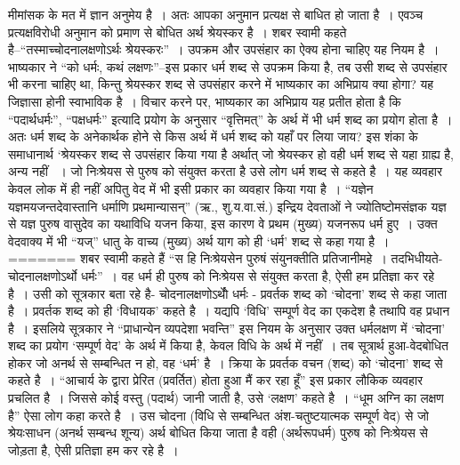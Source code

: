 मीमांसक के मत में ज्ञान अनुमेय है~। अतः आपका अनुमान प्रत्यक्ष से बाधित हो जाता है~। एवञ्च प्रत्यक्षविरोधी अनुमान को प्रमाण से बोधित अर्थ श्रेयस्कर है~। शबर स्वामी कहते है–“तस्माच्चोदनालक्षणोऽर्थः श्रेयस्करः”~। उपक्रम और उपसंहार का ऐक्य होना चाहिए यह नियम है~। भाष्यकार ने “को धर्मः, कथं लक्षणः”–इस प्रकार धर्म शब्द से उपक्रम किया है, तब उसी शब्द से उपसंहार भी करना चाहिए था, किन्तु श्रेयस्कर शब्द से उपसंहार करने में भाष्यकार का अभिप्राय क्या होगा? यह जिज्ञासा होनी स्वाभाविक है~। विचार करने पर, भाष्यकार का अभिप्राय यह प्रतीत होता है कि “पदार्थधर्मः”, “पक्षधर्मः” इत्यादि प्रयोग के अनुसार “वृत्तिमत्” के अर्थ में भी धर्म शब्द का प्रयोग होता है~। अतः धर्म शब्द के अनेकार्थक होने से किस अर्थ में धर्म शब्द को यहाँ पर लिया जाय? इस शंका के समाधानार्थ ‘श्रेयस्कर शब्द से उपसंहार किया गया है अर्थात् जो श्रेयस्कर हो वही धर्म शब्द से यहा ग्राह्य है, अन्य नहीं ~। जो निःश्रेयस से पुरुष को संयुक्त करता है उसे लोग धर्म शब्द से कहते है~। यह व्यवहार केवल लोक में ही नहीं अपितु वेद में भी इसी प्रकार का व्यवहार किया गया है~। “यज्ञेन यज्ञमयजन्तदेवास्तानि धर्माणि प्रथमान्यासन्” (ऋ., शु.य.वा.सं.) इन्द्रिय देवताओं ने ज्योतिष्टोमसंज्ञक यज्ञ से यज्ञ पुरुष वासुदेव का यथाविधि यजन किया, इस कारण वे प्रथम (मुख्य) यजनरूप धर्म हुए~। उक्त वेदवाक्य में भी “यज्” धातु के वाच्य (मुख्य) अर्थ याग को ही ‘धर्म' शब्द से कहा गया है~।
=======
शबर स्वामी कहते हैं “स हि निःश्रेयसेन पुरुषं संयुनक्तीति प्रतिजानीमहे~। तदभिधीयते-चोदनालक्षणोऽर्थो धर्मः”~। वह धर्म ही पुरुष को निःश्रेयस से संयुक्त करता है, ऐसी हम प्रतिज्ञा कर रहे है~। उसी को सूत्रकार बता रहे है- चोदनालक्षणोऽर्थोे धर्मः - प्रवर्तक शब्द को ‘चोदना' शब्द से कहा जाता है~। प्रवर्तक शब्द को ही ‘विधायक' कहते है~। यद्यपि ‘विधि' सम्पूर्ण वेद का एकदेश है तथापि वह प्रधान है~। इसलिये सूत्रकार ने “प्राधान्येन व्यपदेशा भवन्ति” इस नियम के अनुसार उक्त धर्मलक्षण में ‘चोदना' शब्द का प्रयोग ‘सम्पूर्ण वेद' के अर्थ में किया है, केवल विधि के अर्थ में नहीं~। तब सूत्रार्थ हुआ-वेदबोधित होकर जो अनर्थ से सम्बन्धित न हो, वह ‘धर्म' है~। क्रिया के प्रवर्तक वचन (शब्द) को ‘चोदना' शब्द से कहते है~। “आचार्य के द्वारा प्रेरित (प्रवर्तित) होता हुआ मैं कर रहा हूँ” इस प्रकार लौकिक व्यवहार प्रचलित है~। जिससे कोई वस्तु (पदार्थ) जानी जाती है, उसे ‘लक्षण' कहते है~। “धूम अग्नि का लक्षण है” ऐसा लोग कहा करते है~। उस चोदना (विधि से सम्बन्धित अंश-चतुष्टयात्मक सम्पूर्ण वेद) से जो श्रेयःसाधन (अनर्थ सम्बन्ध शून्य) अर्थ बोधित किया जाता है वही (अर्थरूपधर्म) पुरुष को निःश्रेयस से जोड़ता है, ऐसी प्रतिज्ञा हम कर रहे है~।

